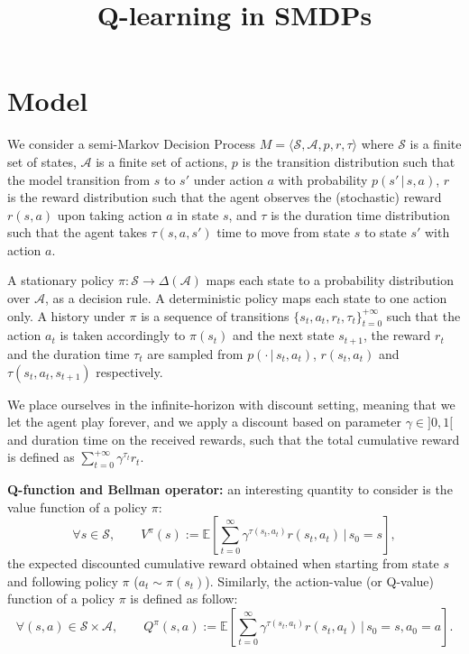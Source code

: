 \documentclass{article}
\title{Q-learning in SMDPs}
\begin{document}
\maketitle

\section{Model}

We consider a semi-Markov Decision Process $M = \langle \mathcal{S}, \mathcal{A}, p, r, \tau \rangle$ where $\mathcal{S}$ is a finite set of states, $\mathcal{A}$ is a finite set of actions, $p$ is the transition distribution such that the model transition from $s$ to $s'$ under action $a$ with probability $p(s' \, | \, s, a)$, $r$ is the reward distribution such that the agent observes the (stochastic) reward $r(s, a)$ upon taking action $a$ in state $s$, and $\tau$ is the duration time distribution such that the agent takes $\tau(s, a, s')$ time to move from state $s$ to state $s'$ with action $a$.

A stationary policy $\pi : \mathcal{S} \to \Delta(\mathcal{A})$ maps each state to a probability distribution over $\mathcal{A}$, as a decision rule. A deterministic policy maps each state to one action only. A history under $\pi$ is a sequence of transitions $\{s_t, a_t, r_t, \tau_t\}_{t = 0}^{+ \infty}$ such that the action $a_t$ is taken accordingly to $\pi(s_t)$ and the next state $s_{t+1}$, the reward $r_t$ and the duration time $\tau_t$ are sampled from $p(\cdot \, |\, s_t, a_t)$, $r(s_t, a_t)$ and $\tau(s_t, a_t, s_{t+1})$ respectively.

We place ourselves in the infinite-horizon with discount setting, meaning that we let the agent play forever, and we apply a discount based on parameter  $\gamma \in ]0, 1[$ and duration time on the received rewards, such that the total cumulative reward is defined as $\sum_{t = 0}^{+ \infty} \gamma^{\tau_t} r_t$.

\textbf{Q-function and Bellman operator:} an interesting quantity to consider is the value function of a policy $\pi$:
$$\forall s \in \mathcal{S}, \qquad V^{\pi}(s) := \mathbb{E} \left[\sum_{t = 0}^{\infty} \gamma^{\tau(s_t, a_t)} r(s_t, a_t) \, |\,  s_0 = s \right],$$
the expected discounted cumulative reward obtained when starting from state $s$ and following policy $\pi$ ($a_t \sim \pi(s_t)$).  Similarly, the action-value (or Q-value) function of a policy $\pi$ is defined as follow:
$$\forall (s, a) \in \mathcal{S} \times \mathcal{A}, \qquad Q^{\pi}(s,a) := \mathbb{E} \left[\sum_{t = 0}^{\infty} \gamma^{\tau(s_t, a_t)} r(s_t, a_t) \, |\,  s_0 = s, a_0 = a \right].$$
\end{document}
